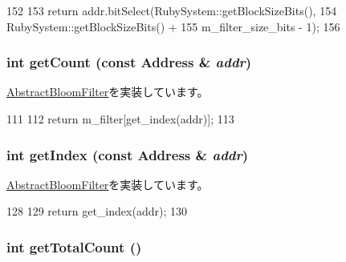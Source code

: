 \begin{DoxyCode}
152 {
153     return addr.bitSelect(RubySystem::getBlockSizeBits(),
154                           RubySystem::getBlockSizeBits() +
155                           m_filter_size_bits - 1);
156 }
\end{DoxyCode}
\hypertarget{classLSB__CountingBloomFilter_abb722634d5846105b673e9496df8d062}{
\subsubsection[{getCount}]{\setlength{\rightskip}{0pt plus 5cm}int getCount (const {\bf Address} \& {\em addr})}}
\label{classLSB__CountingBloomFilter_abb722634d5846105b673e9496df8d062}


\hyperlink{classAbstractBloomFilter_ab6253919ea6ff1b2c17506742b34147d}{AbstractBloomFilter}を実装しています。


\begin{DoxyCode}
111 {
112     return m_filter[get_index(addr)];
113 }
\end{DoxyCode}
\hypertarget{classLSB__CountingBloomFilter_a19f42f6f2fc3501021b768f0df8108b2}{
\subsubsection[{getIndex}]{\setlength{\rightskip}{0pt plus 5cm}int getIndex (const {\bf Address} \& {\em addr})}}
\label{classLSB__CountingBloomFilter_a19f42f6f2fc3501021b768f0df8108b2}


\hyperlink{classAbstractBloomFilter_a4dd174ae24a8237d41cf0b02c78b896d}{AbstractBloomFilter}を実装しています。


\begin{DoxyCode}
128 {
129     return get_index(addr);
130 }
\end{DoxyCode}
\hypertarget{classLSB__CountingBloomFilter_a97f66183ea41a7c123bab9dd5313a74a}{
\subsubsection[{getTotalCount}]{\setlength{\rightskip}{0pt plus 5cm}int getTotalCount ()}}
\label{classLSB__CountingBloomFilter_a97f66183ea41a7c123bab9dd5313a74a}


